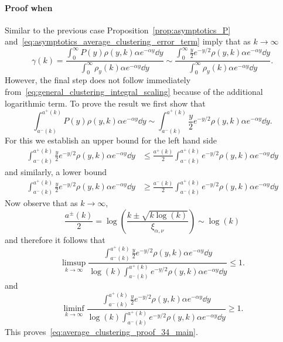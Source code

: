 \paragraph{Proof when }
Similar to the previous case Proposition~\ref{prop:asymptotics_P} and~\eqref{eq:asymptotics_average_clustering_error_term} imply that as $k \to \infty$
\[
	\gamma(k) = \frac{\int_0^{\infty} P(y) \rho(y,k) \alpha  e^{-\alpha y} \dd y}
	{\int_0^\infty \rho_{y}(k) \alpha e^{-\alpha y} \dd y}
	\sim  \frac{\int_0^{\infty} \frac{y}{2} e^{-y/2} \rho(y,k) \alpha  e^{-\alpha y} \dd y}
		{\int_0^\infty \rho_{y}(k) \alpha e^{-\alpha y} \dd y}.
\]
However, the final step does not follow immediately from~\eqref{eq:general_clustering_integral_scaling} because of the additional logarithmic term. To prove the result we first show that
\begin{equation}\label{eq:average_clustering_proof_34_main}
	\int_{a^-(k)}^{a^+(k)} P(y) \rho(y,k) \alpha e^{-\alpha y} \dd y
	\sim \int_{a^-(k)}^{a^+(k)} \frac{y}{2} e^{-y/2} \rho(y,k) \alpha e^{-\alpha y} \dd y.
\end{equation}
For this we establish an upper bound for the left hand side
\begin{align*}
	\int_{a^-(k)}^{a^+(k)} \frac{y}{2} e^{-y/2} \rho(y,k) \alpha e^{-\alpha y} \dd y
	&\le \frac{a^+(k)}{2} \int_{a^-(k)}^{a^+(k)} e^{-y/2} \rho(y,k) \alpha e^{-\alpha y} \dd y
\end{align*}
and similarly, a lower bound
\begin{align*}
	\int_{a^-(k)}^{a^+(k)} \frac{y}{2} e^{-y/2} \rho(y,k) \alpha e^{-\alpha y} \dd y
	&\ge \frac{a^-(k)}{2} \int_{a^-(k)}^{a^+(k)} e^{-y/2} \rho(y,k) \alpha e^{-\alpha y} \dd y
\end{align*}
Now observe that as $k \to \infty$,
\[
	\frac{a^\pm(k)}{2} = \log\left(\frac{k \pm \sqrt{k\log(k)}}{\xi_{\alpha, \nu}}\right) \sim \log(k)
\]
and therefore it follows that
\[
	\limsup_{k \to \infty} \frac{\int_{a^-(k)}^{a^+(k)} \frac{y}{2} e^{-y/2} \rho(y,k) \alpha e^{-\alpha y} \dd y}
	{\log(k) \int_{a^-(k)}^{a^+(k)} e^{-y/2} \rho(y,k) \alpha e^{-\alpha y} \dd y} \le 1.
\]
and
\[
	\liminf_{k \to \infty} \frac{\int_{a^-(k)}^{a^+(k)} \frac{y}{2} e^{-y/2} \rho(y,k) \alpha e^{-\alpha y} \dd y}
	{\log(k) \int_{a^-(k)}^{a^+(k)} e^{-y/2} \rho(y,k) \alpha e^{-\alpha y} \dd y} \ge 1.
\]
This proves~\eqref{eq:average_clustering_proof_34_main}.

